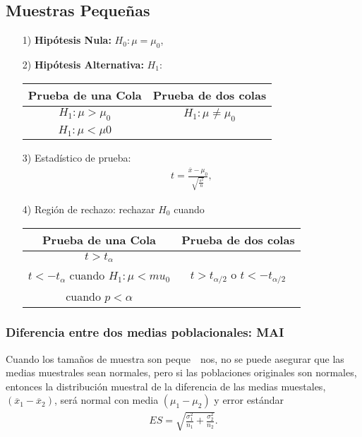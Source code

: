 \documentclass[a4paper]{report} %
\begin{document}
\subsection{Muestras Peque\~nas}

\begin{itemize}
\item[1) ] \textbf{Hip\'otesis Nula:} $H_{0}:\mu=\mu_{0}$,
\item[2) ] \textbf{Hip\'otesis Alternativa: } $H_{1}:$
\begin{center}
\begin{tabular}{cc}\hline
\textbf{Prueba de una Cola} & \textbf{Prueba de dos colas}\\\hline
$H_{1}:\mu>\mu_{0}$ & $H_{1}:\mu\neq \mu_{0}$\\ 
$H_{1}:\mu<\mu0$&\\
\end{tabular}
\end{center}

\item[3) ] Estad\'istico de prueba:
\begin{eqnarray}
t=\frac{\overline{x}-\mu_{0}}{\sqrt{\frac{s^{2}}{n}}},
\end{eqnarray}
\item[4) ] Regi\'on de rechazo: rechazar $H_{0}$ cuando
\begin{center}
\begin{tabular}{cc}\hline
\textbf{Prueba de una Cola} & \textbf{Prueba de dos colas}\\\hline
$t>t_{\alpha}$ & \\
$t<-t_{\alpha}$ cuando $H_{1}:\mu<mu_{0}$&$t>t_{\alpha/2}$ o $t<-t_{\alpha/2}$\\
 cuando $p<\alpha$&\\
\end{tabular}
\end{center}
\end{itemize}
\subsubsection{Diferencia entre dos medias poblacionales: MAI}

Cuando los tama\~nos de muestra son peque\ ~nos, no se puede asegurar que las medias muestrales sean normales, pero si las poblaciones originales son normales, entonces la distribuci\'on muestral de la diferencia de las medias muestales, $\left(\overline{x}_{1}-\overline{x}_{2}\right)$, ser\'a normal con media $\left(\mu_{1}-\mu_{2}\right)$ y error est\'andar \begin{eqnarray}ES=\sqrt{\frac{\sigma_{1}^{2}}{n_{1}}+\frac{\sigma_{2}^{2}}{n_{2}}}.\end{eqnarray}
\end{document}
